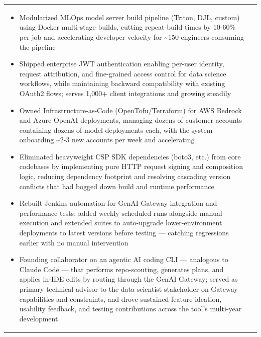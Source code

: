 \documentclass[a4paper,12pt]{article}
\begin{document}
\begin{tabularx}{\linewidth}{ @{}l r@{} }
{\begin{minipage}[t]{\linewidth}
\begin{itemize}[nosep,after=\strut, leftmargin=1em, itemsep=3pt]
\begin{itemize}
			\item Modularized MLOps model server build pipeline (Triton, DJL, custom) using Docker multi-stage builds, cutting repeat-build times by 10-60\% per job and accelerating developer velocity for \textasciitilde150 engineers consuming the pipeline
			\item Shipped enterprise JWT authentication enabling per-user identity, request attribution, and fine-grained access control for data science workflows, while maintaining backward compatibility with existing OAuth2 flows; serves 1,000+ client integrations and growing steadily
			\item Owned Infrastructure-as-Code (OpenTofu/Terraform) for AWS Bedrock and Azure OpenAI deployments, managing dozens of customer accounts containing dozens of model deployments each, with the system onboarding \textasciitilde2-3 new accounts per week and accelerating
			\item Eliminated heavyweight CSP SDK dependencies (boto3, etc.) from core codebases by implementing pure HTTP request signing and composition logic, reducing dependency footprint and resolving cascading version conflicts that had bogged down build and runtime performance
			\item Rebuilt Jenkins automation for GenAI Gateway integration and performance tests; added weekly scheduled runs alongside manual execution and extended suites to auto-upgrade lower-environment deployments to latest versions before testing --- catching regressions earlier with no manual intervention
			\item Founding collaborator on an agentic AI coding CLI --- analogous to Claude Code --- that performs repo-scouting, generates plans, and applies in-IDE edits by routing through the GenAI Gateway; served as primary technical advisor to the data-scientist stakeholder on Gateway capabilities and constraints, and drove sustained feature ideation, usability feedback, and testing contributions across the tool's multi-year development
		\end{itemize}
    \end{itemize}
    \end{minipage}
}
\end{tabularx}
\end{document}
